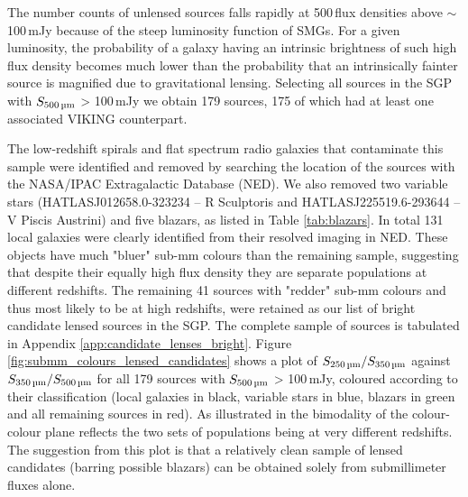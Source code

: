The number counts of unlensed sources falls rapidly at 500\,\micron flux densities above $\sim$ 100\,mJy because of the steep luminosity function of SMGs. For a given luminosity, the probability of a galaxy having an intrinsic brightness of such high flux density becomes much lower than the probability that an intrinsically fainter source is magnified due to gravitational lensing. Selecting all sources in the SGP with $S_{\textrm{500\,\micron}}$ > 100\,mJy we obtain 179 sources, 175 of which had at least one associated VIKING counterpart. 

The low-redshift spirals and flat spectrum radio galaxies that contaminate this sample were identified and removed by searching the location of the sources with the NASA/IPAC Extragalactic Database (NED). We also removed two variable stars (HATLASJ012658.0-323234 -- R Sculptoris and HATLASJ225519.6-293644 -- V Piscis Austrini) and five blazars, as listed in Table \ref{tab:blazars}. In total 131 local galaxies were clearly identified from their resolved imaging in NED. These objects have much "bluer" sub-mm colours than the remaining sample, suggesting that despite their equally high flux density they are separate populations at different redshifts. The remaining 41 sources with "redder" sub-mm colours and thus most likely to be at high redshifts, were retained as our list of bright candidate lensed sources in the SGP. The complete sample of sources is tabulated in Appendix \ref{app:candidate_lenses_bright}. Figure \ref{fig:submm_colours_lensed_candidates} shows a plot of $S_{\textrm{250\,\micron}}/S_{\textrm{350\,\micron}}$ against $S_{\textrm{350\,\micron}}/S_{\textrm{500\,\micron}}$ for all 179 sources with $S_{\textrm{500\,\micron}}$ > 100\,mJy, coloured according to their classification (local galaxies in black, variable stars in blue, blazars in green and all remaining sources in red). As illustrated in \citealt{Negrello_2017} the bimodality of the colour-colour plane reflects the two sets of populations being at very different redshifts. The suggestion from this plot is that a relatively clean sample of lensed candidates (barring possible blazars) can be obtained solely from submillimeter fluxes alone.

